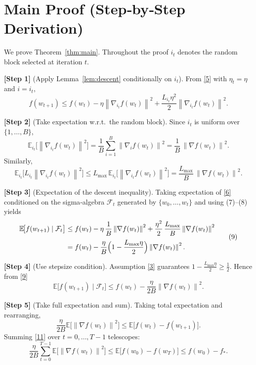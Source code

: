 \documentclass{article}
\newcommand{\E}{\mathbb{E}}
\newcommand{\norm}[1]{\left\lVert#1\right\rVert}
\begin{document}
\section*{Main Proof (Step‑by‑Step Derivation)}
We prove Theorem~\ref{thm:main}. Throughout the proof $i_t$ denotes the random block selected at iteration $t$.

\bigskip
\noindent\textbf{[Step 1]} (Apply Lemma~\ref{lem:descent} conditionally on $i_t$).  
From \eqref{5} with $\eta_t=\eta$ and $i=i_t$,
\[
f(w_{t+1})
\le
f(w_t)-\eta \norm{\nabla_{i_t} f(w_t)}^{2}
+\frac{L_{i_t}\eta^{2}}{2}\norm{\nabla_{i_t} f(w_t)}^{2}.
\tag{6}
\]

\noindent\textbf{[Step 2]} (Take expectation w.r.t.\ the random block).  
Since $i_t$ is uniform over $\{1,\dots ,B\}$,
\[
\E_{i_t}\!\big[\norm{\nabla_{i_t} f(w_t)}^{2}\big]
= \frac{1}{B}\sum_{i=1}^{B}\norm{\nabla_i f(w_t)}^{2}
= \frac{1}{B}\,\norm{\nabla f(w_t)}^{2}.
\tag{7}
\]
Similarly,
\[
\E_{i_t}\!\big[L_{i_t}\norm{\nabla_{i_t} f(w_t)}^{2}\big]
\le L_{\max}\,\E_{i_t}\!\big[\norm{\nabla_{i_t} f(w_t)}^{2}\big]
= \frac{L_{\max}}{B}\,\norm{\nabla f(w_t)}^{2}.
\tag{8}
\]

\noindent\textbf{[Step 3]} (Expectation of the descent inequality).  
Taking expectation of \eqref{6} conditioned on the sigma‑algebra $\mathcal{F}_t$ generated by $\{w_0,\dots ,w_t\}$ and using (7)–(8) yields
\[
\begin{aligned}
\E\!\big[f(w_{t+1})\mid\mathcal{F}_t\big]
&\le
f(w_t)
-\eta\,\frac{1}{B}\norm{\nabla f(w_t)}^{2}
+\frac{\eta^{2}}{2}\,\frac{L_{\max}}{B}\norm{\nabla f(w_t)}^{2}\\[0.2em]
&=
f(w_t)
-\frac{\eta}{B}\Bigl(1-\frac{L_{\max}\eta}{2}\Bigr)\norm{\nabla f(w_t)}^{2}.
\end{aligned}
\tag{9}
\]

\noindent\textbf{[Step 4]} (Use stepsize condition).  
Assumption \eqref{3} guarantees $1-\frac{L_{\max}\eta}{2}\ge \frac{1}{2}$. Hence from \eqref{9}
\[
\E\!\big[f(w_{t+1})\mid\mathcal{F}_t\big]
\le
f(w_t)-\frac{\eta}{2B}\norm{\nabla f(w_t)}^{2}.
\tag{10}
\]

\noindent\textbf{[Step 5]} (Take full expectation and sum).  
Taking total expectation and rearranging,
\[
\frac{\eta}{2B}\E\!\big[\norm{\nabla f(w_t)}^{2}\big]
\le
\E\!\big[f(w_t)-f(w_{t+1})\big].
\tag{11}
\]
Summing \eqref{11} over $t=0,\dots ,T-1$ telescopes:
\[
\frac{\eta}{2B}\sum_{t=0}^{T-1}\E\!\big[\norm{\nabla f(w_t)}^{2}\big]
\le
\E\!\big[f(w_0)-f(w_T)\big]
\le
f(w_0)-f_* .
\tag{12}
\]
\end{document}
